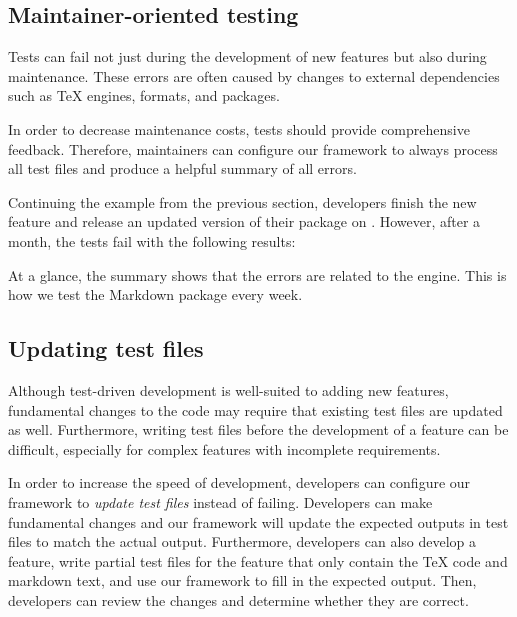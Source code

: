 \documentclass[final]{ltugboat}
\begin{document}
\subsection{Maintainer-oriented testing}

Tests can fail not just during the development of new features but also during maintenance. These errors are often caused by changes to external dependencies such as \TeX{} engines, formats, and packages.

In order to decrease maintenance costs, tests should provide comprehensive feedback. Therefore, maintainers can configure our framework to always process all test files and produce a helpful summary of all errors.

Continuing the example from the previous section, developers finish the new feature and release an updated version of their package on . However, after a month, the tests fail with the following results:

\smallskip
\noindent
\begingroup
\centering

\par
\endgroup

\smallskip
\noindent
At a glance, the summary shows that the errors are related to the  engine. This is how we test the Markdown package every week.

\subsection{Updating test files}
\label{sec:updating-test-files}

Although test-driven development is well-suited to adding new features, fundamental changes to the code may require that existing test files are updated as well. Furthermore, writing test files before the development of a feature can be difficult, especially for complex features with incomplete requirements.

In order to increase the speed of development, developers can configure our framework to \emph{update test files} instead of failing. Developers can make fundamental changes and our framework will update the expected outputs in test files to match the actual output. Furthermore, developers can also develop a feature, write partial test files for the feature that only contain the \TeX{} code and markdown text, and use our framework to fill in the expected output. Then, developers can review the changes and determine whether they are correct.
\end{document}
